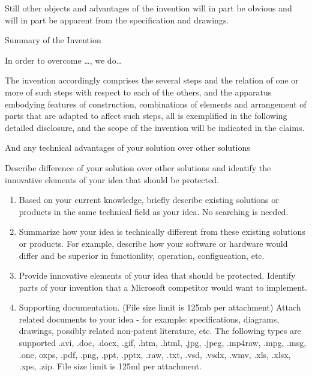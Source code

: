 \documentclass[english]{uspatent}
\begin{document}
\patentParagraph Still other objects and advantages of the invention will in part be obvious and will in part be apparent from the specification and drawings.

\patentParagraph Summary of the Invention

\patentParagraph In order to overcome \ldots, we do\ldots

\patentParagraph The invention accordingly comprises the several steps and the relation of one or more of such steps with respect to each of the others, and the apparatus embodying features of construction, combinations of elements and arrangement of parts that are adapted to affect such steps, all is exemplified in the following detailed disclosure, and the scope of the invention will be indicated in the claims.

And any technical advantages of your solution over other solutions

Describe difference of your solution over other solutions and identify the innovative elements of your idea that should be protected.

\begin{enumerate}
	\item Based on your current knowledge, briefly describe existing solutions or products in the same technical field as your idea. No searching is needed.
	\item Summarize how your idea is technically different from these existing solutions or products. For example, describe how your software or hardware would differ and be superior in functionlity, operation, configueation, etc.
	\item Provide innovative elements of your idea that should be protected. Identify parts of your invention that a Microsoft competitor would want to implement.
	\item Supporting documentation. (File size limit is 125mb per attachment) Attach related documents to your idea - for example: specifications, diagrams, drawings, possibly related non-patent literature, etc. The following types are supported .avi, .doc, .docx, .gif, .htm, .html, .jpg, .jpeg, .mp4raw, .mpg, .msg, .one, oxps, .pdf, .png, .ppt, .pptx, .raw, .txt, .vsd, .vsdx, .wmv, .xls, .xlsx, .xps, .zip. File size limit is 125ml per attachment.
\end{enumerate}
\end{document}
